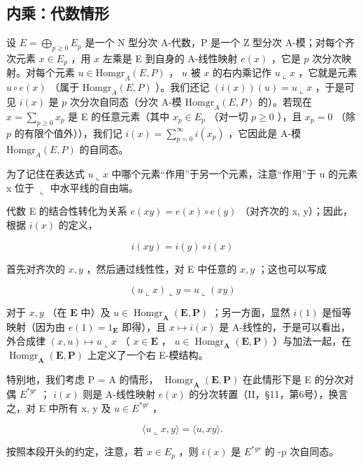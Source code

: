\subsection{内乘：代数情形}

设 \(E = \bigoplus_{p \geqslant 0} E_p\) 是一个 N 型分次 A-代数，P 是一个 Z 型分次 A-模；对每个齐次元素 \(x \in E_p\) ，用 \(x\) 左乘是 E 到自身的 A-线性映射 \(e(x)\) ，它是 \(p\) 次分次映射。对每个元素 \(u \in \text{Homgr}_A(E, P)\) ， \(u\) 被 \(x\) 的右内乘记作 \(u \llcorner x\) ，它就是元素 \(u \circ e(x)\) （属于 \(\text{Homgr}_A(E, P)\) ）。我们还记 \((i(x))(u) = u \llcorner x\) ，于是可见 \(i(x)\) 是 \(p\) 次分次自同态（分次 A-模 \(\text{Homgr}_A(E, P)\) 的）。若现在 \(x = \sum_{p \geqslant 0} x_p\) 是 E 的任意元素（其中 \(x_p \in E_p\) （对一切 \(p \geqslant 0\) ），且 \(x_p = 0\) （除 \(p\) 的有限个值外）），我们记 \(i(x) = \sum_{p=0}^{\infty} i(x_p)\) ，它因此是 A-模 \(\text{Homgr}_A(E, P)\) 的自同态。

为了记住在表达式 \(u \llcorner x\) 中哪个元素“作用”于另一个元素，注意“作用”于 u 的元素 x 位于 \(\llcorner\) 中水平线的自由端。

代数 E 的结合性转化为关系 \(e(xy) = e(x) \circ e(y)\) （对齐次的 x, y）；因此，根据 \(i(x)\) 的定义，

\[
i (x y) = i (y) \circ i (x)\tag{35}
\]

首先对齐次的 \(x, y\) ，然后通过线性性，对 E 中任意的 \(x, y\) ；这也可以写成

\[
(u \llcorner x) \llcorner y = u \llcorner (x y)\tag{36}
\]

对于 \(x, y\) （在 \(\mathbf{E}\) 中）及 \(u \in \operatorname{Homgr}_{\mathbf{A}}(\mathbf{E}, \mathbf{P})\) ；另一方面，显然 \(i(1)\) 是恒等映射（因为由 \(e(1) = 1_{\mathbf{E}}\) 即得），且 \(x \mapsto i(x)\) 是 A-线性的，于是可以看出，外合成律 \((x, u) \mapsto u \llcorner x\) （ \(x \in \mathbf{E}\) ， \(u \in \operatorname{Homgr}_{\mathbf{A}}(\mathbf{E}, \mathbf{P})\) ）与加法一起，在 \(\operatorname{Homgr}_{\mathbf{A}}(\mathbf{E}, \mathbf{P})\) 上定义了一个右 E-模结构。

特别地，我们考虑 P = A 的情形， \(\operatorname{Homgr}_{\mathbf{A}}(\mathbf{E}, \mathbf{P})\) 在此情形下是 E 的分次对偶 \(E^{*gr}\) ； \(i(x)\) 则是 A-线性映射 \(e(x)\) 的分次转置（II，§11，第6号），换言之，对 E 中所有 x, y 及 \(u \in E^{*gr}\) ，

\[
\langle u \llcorner x, y \rangle = \langle u, x y \rangle .\tag{37}
\]

按照本段开头的约定，注意，若 \(x \in E_{p}\) ，则 \(i(x)\) 是 \(E^{*gr}\) 的 -p 次自同态。

